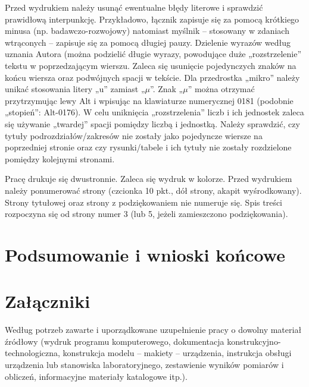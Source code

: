 \documentclass[12pt,twoside]{article}
\begin{document}
Przed wydrukiem należy usunąć ewentualne błędy literowe i sprawdzić prawidłową
interpunkcję. Przykładowo, łącznik zapisuje się za pomocą krótkiego minusa (np.
badawczo-rozwojowy) natomiast myślnik -- stosowany w zdaniach wtrąconych -- zapisuje
się za pomocą długiej pauzy. Dzielenie wyrazów według uznania Autora (można podzielić
długie wyrazy, powodujące duże „rozstrzelenie” tekstu w poprzedzającym wierszu. Zaleca się usunięcie pojedynczych znaków na końcu wiersza oraz podwójnych spacji w tekście.
Dla przedrostka „mikro” należy unikać stosowania litery „u” zamiast „$\mu$”. Znak „$\mu$” można
otrzymać przytrzymując lewy Alt i wpisując na klawiaturze numerycznej 0181 (podobnie
„stopień”: Alt-0176). W celu uniknięcia „rozstrzelenia” liczb i ich jednostek zaleca się
używanie „twardej” spacji pomiędzy liczbą i jednostką. Należy sprawdzić, czy tytuły
podrozdziałów/zakresów nie zostały jako pojedyncze wiersze na poprzedniej stronie oraz
czy rysunki/tabele i ich tytuły nie zostały rozdzielone pomiędzy kolejnymi stronami.

Pracę drukuje się dwustronnie. Zaleca się wydruk w kolorze. Przed wydrukiem
należy ponumerować strony (czcionka 10 pkt., dół strony, akapit wyśrodkowany). Strony
tytułowej oraz strony z podziękowaniem nie numeruje się. Spis treści rozpoczyna się od
strony numer 3 (lub 5, jeżeli zamieszczono podziękowania).

\clearpage

\section{Podsumowanie i wnioski końcowe}


\clearpage

\section*{Załączniki}

Według potrzeb zawarte i uporządkowane uzupełnienie pracy o dowolny materiał źródłowy (wydruk programu komputerowego, dokumentacja kons\-truk\-cyj\-no-\-tech\-no\-lo\-gicz\-na, konstrukcja modelu -- makiety -- urządzenia, instrukcja obsługi urządzenia lub stanowiska laboratoryjnego, zestawienie wyników pomiarów i obliczeń, informacyjne materiały katalogowe itp.).


\clearpage

\end{document}
